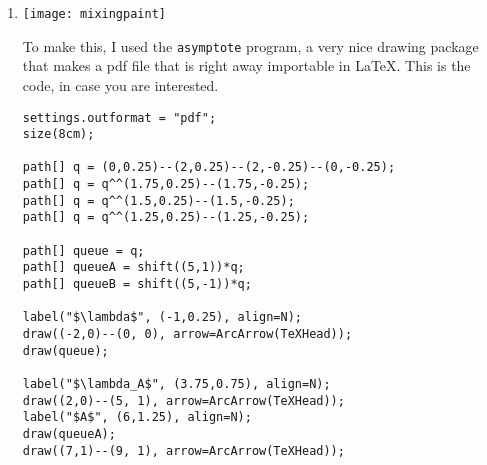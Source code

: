 \begin{question}[use=false]
\begin{solution}
  \begin{enumerate}
  \item 
\texttt{[image: mixingpaint]}

To make this, I used the \texttt{asymptote} program, a very nice
drawing package that makes a pdf file that is right away importable in
\LaTeX. This is the code, in case you are interested.

\begin{lstlisting}
settings.outformat = "pdf";
size(8cm);

path[] q = (0,0.25)--(2,0.25)--(2,-0.25)--(0,-0.25);
path[] q = q^^(1.75,0.25)--(1.75,-0.25);
path[] q = q^^(1.5,0.25)--(1.5,-0.25);
path[] q = q^^(1.25,0.25)--(1.25,-0.25);

path[] queue = q;
path[] queueA = shift((5,1))*q;
path[] queueB = shift((5,-1))*q;

label("$\lambda$", (-1,0.25), align=N);
draw((-2,0)--(0, 0), arrow=ArcArrow(TeXHead));
draw(queue);

label("$\lambda_A$", (3.75,0.75), align=N);
draw((2,0)--(5, 1), arrow=ArcArrow(TeXHead));
label("$A$", (6,1.25), align=N);
draw(queueA);
draw((7,1)--(9, 1), arrow=ArcArrow(TeXHead));


\end{lstlisting}
\end{enumerate}
\end{solution}
\end{question}
